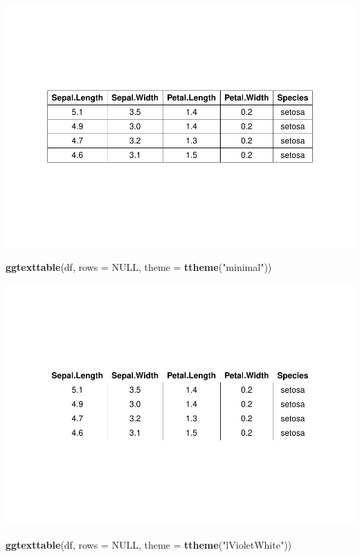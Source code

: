 \documentclass[
]{book}
\newenvironment{Shaded}{\begin{snugshade}}{\end{snugshade}}
\newcommand{\AttributeTok}[1]{\textcolor[rgb]{0.13,0.29,0.53}{#1}}
\newcommand{\ConstantTok}[1]{\textcolor[rgb]{0.56,0.35,0.01}{#1}}
\newcommand{\FunctionTok}[1]{\textcolor[rgb]{0.13,0.29,0.53}{\textbf{#1}}}
\newcommand{\NormalTok}[1]{#1}
\newcommand{\StringTok}[1]{\textcolor[rgb]{0.31,0.60,0.02}{#1}}
\begin{document}
\includegraphics{R_Manual_files/figure-latex/unnamed-chunk-232-3.pdf}

\begin{Shaded}
\begin{Highlighting}[]
\FunctionTok{ggtexttable}\NormalTok{(df, }\AttributeTok{rows =} \ConstantTok{NULL}\NormalTok{, }\AttributeTok{theme =} \FunctionTok{ttheme}\NormalTok{(}\StringTok{"minimal"}\NormalTok{))}
\end{Highlighting}
\end{Shaded}

\includegraphics{R_Manual_files/figure-latex/unnamed-chunk-232-4.pdf}

\begin{Shaded}
\begin{Highlighting}[]
\FunctionTok{ggtexttable}\NormalTok{(df, }\AttributeTok{rows =} \ConstantTok{NULL}\NormalTok{, }\AttributeTok{theme =} \FunctionTok{ttheme}\NormalTok{(}\StringTok{"lVioletWhite"}\NormalTok{))}
\end{Highlighting}
\end{Shaded}
\end{document}
